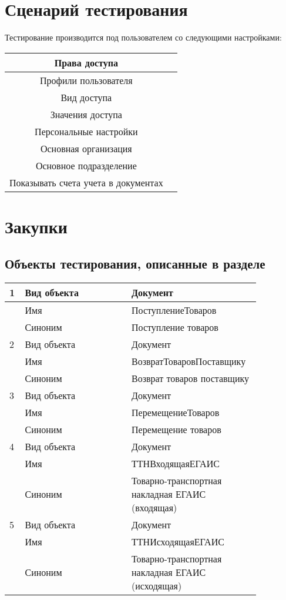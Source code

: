 \section{Сценарий тестирования}

Тестирование производится под пользователем со следующими настройками:

\begin{tabular}{|c|c|}
	\hline
	Права доступа &  \\
	\hline
	Профили пользователя &  \\
	\hline
	Вид доступа &  \\
	\hline
	Значения доступа &  \\
	\hline
	Персональные настройки &  \\
	\hline
	Основная организация &  \\
	\hline
	Основное подразделение &  \\
	\hline
	Показывать счета учета в документах &  \\
	\hline
\end{tabular}

\section{Закупки}
\subsection{Объекты тестирования, описанные в разделе}

\begin{tabular}{p{0.05\linewidth}p{0.4\linewidth}p{0.4\linewidth}}
	\toprule   
	1 & Вид объекта & Документ \\
	\hline
	  & Имя & ПоступлениеТоваров \\
	\hline
	 & Синоним  & Поступление товаров \\
	\hline
	2 & Вид объекта  & Документ \\
	\hline
 	 & Имя & ВозвратТоваровПоставщику \\
	\hline
	 & Синоним  & Возврат товаров поставщику \\
	\hline
	3 & Вид объекта  & Документ \\
	\hline
	& Имя & ПеремещениеТоваров \\
	\hline
	& Синоним  & Перемещение товаров \\
	\hline
	4 & Вид объекта  & Документ \\
	\hline
	& Имя & ТТНВходящаяЕГАИС \\
	\hline
	& Синоним  & Товарно-транспортная накладная ЕГАИС (входящая) \\
	\hline
	5 & Вид объекта  & Документ \\
	\hline
	& Имя & ТТНИсходящаяЕГАИС \\
	\hline
	& Синоним  & Товарно-транспортная накладная ЕГАИС (исходящая) \\
	\hline
	\bottomrule %
\end{tabular}

